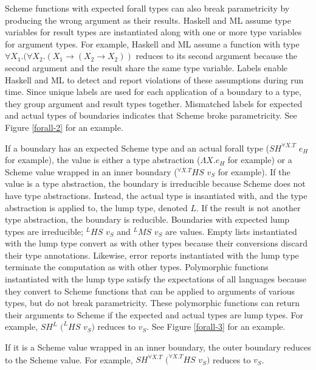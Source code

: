 Scheme functions with expected forall types can also break parametricity by producing the wrong argument as their results.  Haskell and ML assume type variables for result types are instantiated along with one or more type variables for argument types.  For example, Haskell and ML assume a function with type $\forall X_{1}.(\forall X_{2}.(X_{1}\rightarrow(X_{2}\rightarrow X_{2}))$ reduces to its second argument because the second argument and the result share the same type variable.  Labels enable Haskell and ML to detect and report violations of these assumptions during run time.  Since unique labels are used for each application of a boundary to a type, they group argument and result types together.  Mismatched labels for expected and actual types of boundaries indicates that Scheme broke parametricity.  See Figure \ref{forall-2} for an example.



If a boundary has an expected Scheme type and an actual forall type ($SH^{\forall X.T}$ $e_{H}$ for example), the value is either a type abstraction ($\Lambda X.e_{H}$ for example) or a Scheme value wrapped in an inner boundary ($^{\forall X.T}HS$ $v_{S}$ for example).  If the value is a type abstraction, the boundary is irreducible because Scheme does not have type abstractions.  Instead, the actual type is insantiated with, and the type abstraction is applied to, the lump type, denoted $L$.  If the result is not another type abstraction, the boundary is reducible.  Boundaries with expected lump types are irreducible; $^{L}HS$ $v_{S}$ and $^{L}MS$ $v_{S}$ are values.  Empty lists instantiated with the lump type convert as with other types because their conversions discard their type annotations.  Likewise, error reports instantiated with the lump type terminate the computation as with other types.  Polymorphic functions instantiated with the lump type satisfy the expectations of all languages because they convert to Scheme functions that can be applied to arguments of various types, but do not break parametricity.  These polymorphic functions can return their arguments to Scheme if the expected and actual types are lump types.  For example, $SH^{L}$ $(^{L}HS$ $v_{S})$ reduces to $v_{S}$.  See Figure \ref{forall-3} for an example.



If it is a Scheme value wrapped in an inner boundary, the outer boundary reduces to the Scheme value.  For example, $SH^{\forall X.T}$ $(^{\forall X.T}HS$ $v_{S})$ reduces to $v_{S}$.

